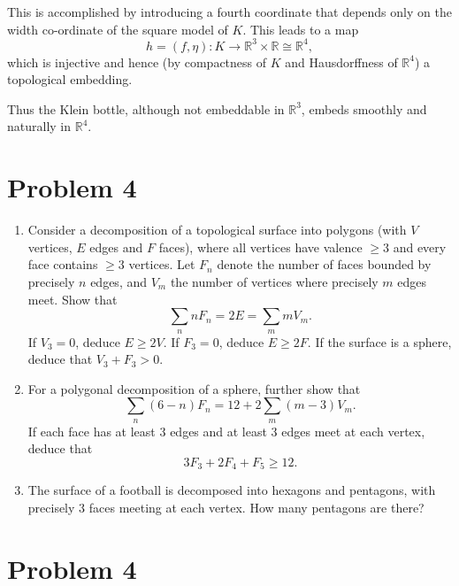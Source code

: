 \documentclass[12pt,a4paper]{article}
\theoremstyle{plain}
\theoremstyle{definition}      %
\begin{document}
This is accomplished by introducing a fourth coordinate that depends only on
the width co-ordinate of the square model of $K$.  
This leads to a map
\[
h = (f,\eta) : K \longrightarrow \mathbb{R}^3 \times \mathbb{R}
\cong \mathbb{R}^4,
\]
which is injective and hence (by compactness of $K$ and Hausdorffness of
$\mathbb{R}^4$) a topological embedding.

Thus the Klein bottle, although not embeddable in $\mathbb{R}^3$, embeds
smoothly and naturally in $\mathbb{R}^4$.

\section*{Problem 4}

\begin{enumerate}[label=\textnormal{(\alph*)}]
	
	\item 
	Consider a decomposition of a topological surface into polygons
	(with \(V\) vertices, \(E\) edges and \(F\) faces), where all vertices
	have valence \(\ge 3\) and every face contains \(\ge 3\) vertices.
	Let \(F_{n}\) denote the number of faces bounded by precisely \(n\) edges,
	and \(V_{m}\) the number of vertices where precisely \(m\) edges meet.
	Show that
	\[
	\sum_{n} n F_{n} = 2E = \sum_{m} m V_{m}.
	\]
	If \(V_{3} = 0\), deduce \(E \ge 2V\).
	If \(F_{3} = 0\), deduce \(E \ge 2F\).
	If the surface is a sphere, deduce that \(V_{3} + F_{3} > 0\).
	
	\item 
	For a polygonal decomposition of a sphere, further show that
	\[
	\sum_{n} (6-n) F_{n}
	= 12 + 2 \sum_{m} (m-3) V_{m}.
	\]
	If each face has at least \(3\) edges and at least \(3\) edges meet
	at each vertex, deduce that
	\[
	3F_{3} + 2F_{4} + F_{5} \ge 12.
	\]
	
	\item
	The surface of a football is decomposed into hexagons and pentagons,
	with precisely \(3\) faces meeting at each vertex.
	How many pentagons are there?
	
\end{enumerate}
\section*{Problem 4}
\end{document}
